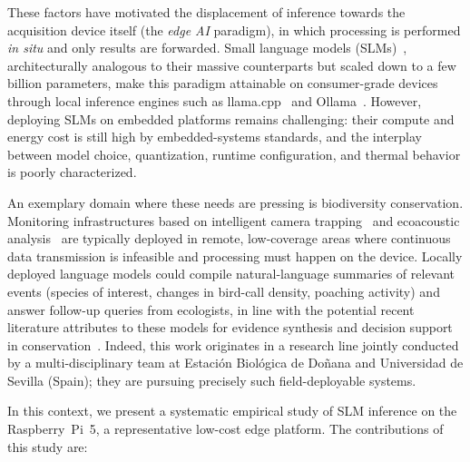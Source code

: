 \documentclass[acmsmall,natbib=false]{acmart}
\begin{document}
These factors have motivated the displacement of inference towards the
acquisition device itself (the \emph{edge AI} paradigm), in which processing
is performed \emph{in situ} and only results are forwarded. Small language
models (SLMs)~\cite{kamath_llms_2024}, architecturally analogous to their
massive counterparts but scaled down to a few billion parameters, make this
paradigm attainable on consumer-grade devices through local inference engines
such as llama.cpp~\cite{gerganov_llamacpp_2023} and
Ollama~\cite{ollama_2023}. However, deploying SLMs on embedded platforms
remains challenging: their compute and energy cost is still high by
embedded-systems standards, and the interplay between model choice,
quantization, runtime configuration, and thermal behavior is poorly
characterized.

An exemplary domain where these needs are pressing is biodiversity conservation.
Monitoring infrastructures based on intelligent camera
trapping~\cite{ai-enabled-camera-traps} and ecoacoustic
analysis~\cite{velasco-montero_-site_2026} are typically deployed in remote,
low-coverage areas where continuous data transmission is infeasible and
processing must happen on the device. Locally deployed language models could
compile natural-language summaries of relevant events (species of interest,
changes in bird-call density, poaching activity) and answer follow-up queries
from ecologists, in line with the potential recent literature attributes
to these models for evidence synthesis and decision support in
conservation~\cite{reynolds_potential_2025,miao_new_2026}. Indeed, this work
originates in a research line jointly conducted by a multi-disciplinary team at 
Estaci\'on Biol\'ogica de Do\~nana and Universidad de Sevilla (Spain); 
they are pursuing precisely such field-deployable systems.

In this context, we present a systematic empirical study of SLM
inference on the Raspberry~Pi~5, a representative low-cost edge platform. The
contributions of this study are:
\end{document}
